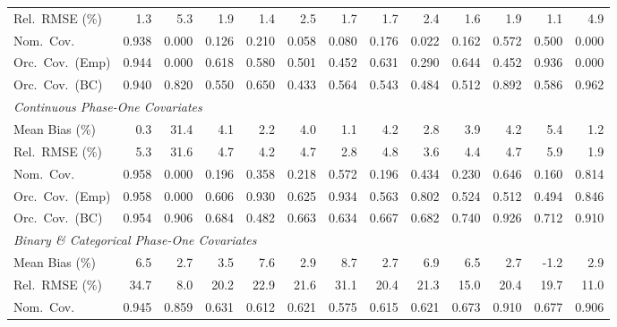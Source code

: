 \begin{landscape}
\begin{table}[!htbp]
{\begin{tabular}{lrrrrrrrrrrrr}
\quad Rel.\ RMSE (\%) & 1.3 & 5.3 & 1.9 & \cellcolor{ranktwo}1.4 & 2.5 & 1.7 & 1.7 & 2.4 & \cellcolor{rankthree}1.6 & 1.9 & \cellcolor{rankone}1.1 & 4.9 \\
\quad Nom.\ Cov. & 0.938 & 0.000 & 0.126 & \cellcolor{rankthree}0.210 & 0.058 & 0.080 & 0.176 & 0.022 & 0.162 & \cellcolor{rankone}0.572 & \cellcolor{ranktwo}0.500 & 0.000 \\
\quad Orc.\ Cov.\ (Emp) & 0.944 & 0.000 & 0.618 & 0.580 & 0.501 & 0.452 & \cellcolor{rankthree}0.631 & 0.290 & \cellcolor{ranktwo}0.644 & 0.452 & \cellcolor{rankone}0.936 & 0.000 \\
\quad Orc.\ Cov.\ (BC) & 0.940 & 0.820 & 0.550 & \cellcolor{rankthree}0.650 & 0.433 & 0.564 & 0.543 & 0.484 & 0.512 & \cellcolor{ranktwo}0.892 & 0.586 & \cellcolor{rankone}0.962 \\
\midrule
\multicolumn{13}{l}{\textit{Continuous Phase-One Covariates}} \\[2pt]
\quad Mean Bias (\%) & 0.3 & 31.4 & 4.1 & \cellcolor{rankthree}2.2 & 4.0 & \cellcolor{rankone}1.1 & 4.2 & 2.8 & 3.9 & 4.2 & 5.4 & \cellcolor{ranktwo}1.2 \\
\quad Rel.\ RMSE (\%) & 5.3 & 31.6 & 4.7 & 4.2 & 4.7 & \cellcolor{ranktwo}2.8 & 4.8 & \cellcolor{rankthree}3.6 & 4.4 & 4.7 & 5.9 & \cellcolor{rankone}1.9 \\
\quad Nom.\ Cov. & 0.958 & 0.000 & 0.196 & 0.358 & 0.218 & \cellcolor{rankthree}0.572 & 0.196 & 0.434 & 0.230 & \cellcolor{ranktwo}0.646 & 0.160 & \cellcolor{rankone}0.814 \\
\quad Orc.\ Cov.\ (Emp) & 0.958 & 0.000 & 0.606 & \cellcolor{ranktwo}0.930 & 0.625 & \cellcolor{rankone}0.934 & 0.563 & 0.802 & 0.524 & 0.512 & 0.494 & \cellcolor{rankthree}0.846 \\
\quad Orc.\ Cov.\ (BC) & 0.954 & 0.906 & 0.684 & 0.482 & 0.663 & 0.634 & 0.667 & 0.682 & \cellcolor{rankthree}0.740 & \cellcolor{rankone}0.926 & 0.712 & \cellcolor{ranktwo}0.910 \\
\midrule
\multicolumn{13}{l}{\textit{Binary \& Categorical Phase-One Covariates}} \\[2pt]
\quad Mean Bias (\%) & 6.5 & 2.7 & 3.5 & 7.6 & \cellcolor{rankthree}2.9 & 8.7 & \cellcolor{ranktwo}2.7 & 6.9 & 6.5 & \cellcolor{ranktwo}2.7 & \cellcolor{rankone}-1.2 & \cellcolor{rankthree}2.9 \\
\quad Rel.\ RMSE (\%) & 34.7 & 8.0 & 20.2 & 22.9 & 21.6 & 31.1 & 20.4 & 21.3 & \cellcolor{ranktwo}15.0 & 20.4 & \cellcolor{rankthree}19.7 & \cellcolor{rankone}11.0 \\
\quad Nom.\ Cov. & 0.945 & 0.859 & 0.631 & 0.612 & 0.621 & 0.575 & 0.615 & 0.621 & 0.673 & \cellcolor{rankone}0.910 & \cellcolor{rankthree}0.677 & \cellcolor{ranktwo}0.906 \\

\end{tabular}}
\end{table}
\end{landscape}

